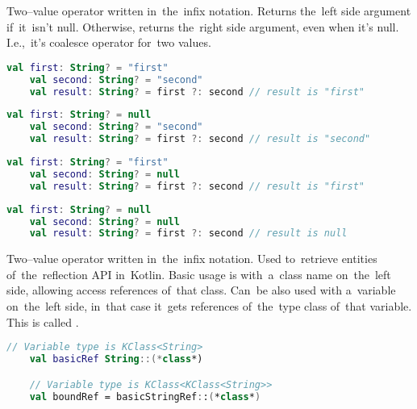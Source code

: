 Two--value operator written in~the~infix notation.
Returns the~left side argument if~it~isn't null.
Otherwise, returns the~right side argument, even when it's null.
I.e.,~it's coalesce operator for~two values.

\begin{lstlisting}[language=Kotlin]
    val first: String? = "first"
    val second: String? = "second"
    val result: String? = first ?: second // result is "first"
\end{lstlisting}

\begin{lstlisting}[language=Kotlin]
    val first: String? = null
    val second: String? = "second"
    val result: String? = first ?: second // result is "second"
\end{lstlisting}

\begin{lstlisting}[language=Kotlin]
    val first: String? = "first"
    val second: String? = null
    val result: String? = first ?: second // result is "first"
\end{lstlisting}
\newpage

\begin{lstlisting}[language=Kotlin]
    val first: String? = null
    val second: String? = null
    val result: String? = first ?: second // result is null
\end{lstlisting}

\label{kotlinreflection}
Two--value operator written in~the~infix notation.
Used to~retrieve entities of~the~reflection API in~Kotlin.
Basic usage is with~a~class name on~the~left side, allowing access references of~that class.
Can~be also used with a~variable on~the~left side, in~that case it~gets references of~the~type class of~that variable.
This is called .

\begin{lstlisting}[language=Kotlin]
    // Variable type is KClass<String>
    val basicRef String::(*class*)

    // Variable type is KClass<KClass<String>>
    val boundRef = basicStringRef::(*class*)
\end{lstlisting}
\newline

